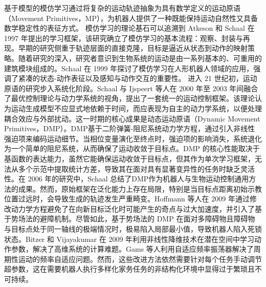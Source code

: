 基于模型的模仿学习通过将复杂的运动轨迹抽象为具有数学定义的运动原语（Movement Primitives，MP）\cite{gutierrez2025movement}，为机器人提供了一种既能保持运动自然性又具备数学稳定性的表征方式。
模仿学习的理论基石可以追溯到 Atkeson 和 Schaal 在 1997 年提出的学习框架\cite{atkeson1997robot}，该研究确立了模仿学习的基本流程：观察、封装与再现。早期的研究侧重于轨迹层面的直接克隆，目标是逼近从状态到动作的映射策略。随着研究的深入，研究者意识到生物系统的运动是由一系列基本的、可重用的建筑模块组成的。Schaal 在 1999 年探讨了模仿学习在人形机器人领域的应用，强调了紧凑的状态-动作表征以及感知与动作交互的重要性\cite{schaal1999imitation}。
进入 21 世纪初，运动原语的研究步入系统化阶段。Schaal 与 Ijspeert 等人在 2000 年至 2003 年间融合了最优控制理论与动力学系统的视角，提出了一套统一的运动控制框架\cite{ijspeert2001trajectory,ijspeert2001trajectory,ijspeert2002learning}。该理论认为运动生成模型不应显式地依赖于时间，而应表现为自主的动力学系统，以便处理耦合效应与外部扰动。这一时期的核心成果是动态运动原语（Dynamic Movement Primitives，DMP）。DMP基于二阶弹簧-阻尼系统动力学方程，通过引入非线性强迫项来编码运动细节。当相位变量演化至终点时，强迫项的影响消失，系统退化为一个简单的阻尼系统，从而确保了运动收敛于目标点。DMP 的核心性能取决于基函数的表达能力，虽然它能确保运动收敛于目标点，但其作为单次学习框架，无法从多个示范中提取统计方差，导致其在面对具有显著变异性的任务时缺乏灵活性。在 2006 年的研究中，Schaal 总结了DMP作为机器人与生物运动控制通用方法的成果\cite{schaal2006dynamic}。然而，原始框架在泛化能力上存在局限，特别是当目标点距离初始示教位置过远时，会导致生成的轨迹发生严重畸变。Hoffmann 等人在 2009 年通过修改动力学方程避免了在向新目标泛化时可能产生的奇点与过大加速度，并引入了基于势场法的避障机制\cite{hoffmann2009biologically}。尽管如此，基于势场法的 DMP 在面对多障碍物且障碍物与目标点处于同一轴线的极端情况时，极易陷入局部最小值，导致机器人陷入死锁状态。Bitzer 和 Vijayakumar 在 2009 年利用非线性降维技术在潜在空间中学习动作参数，解决了高维系统的计算难题\cite{bitzer2009latent}。Gams 等人利用自适应频率振荡器解决了周期性运动的频率自适应问题\cite{gams2009line}。然而，这些改进方法依然需要针对每个任务手动调节超参数，这在需要机器人执行多样化家务任务的非结构化环境中显得过于繁琐且不可持续。

